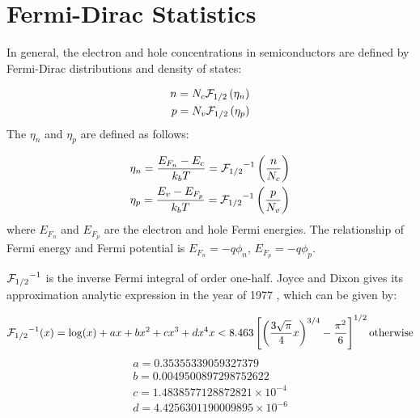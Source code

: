 \documentclass[oneside,12pt]{cgd_book}
\begin{document}
\section{Fermi-Dirac Statistics}
In general, the electron and hole concentrations in semiconductors are defined by Fermi-Dirac
      distributions and density of states:
\par
\begin{subequations}
\begin{align}
 n = N_c {\cal F}_{1/2} \left(\eta _n\right) \\
 p = N_v {\cal F}_{1/2} \left(\eta _p\right)
\end{align}
\end{subequations}
The $\eta _n$ and $\eta _p$ are defined as
      follows:
\par
\begin{subequations}
\begin{align}
 \eta_n = \frac{ E_{F_n} - E_c }{k_b T} = {{\cal F}_{1/2}}^{-1} \left(\frac{n}{N_c}\right) \\
 \eta_p = \frac{ E_v - E_{F_p} }{k_b T} = {{\cal F}_{1/2}}^{-1} \left(\frac{p}{N_v}\right)
\end{align}
\end{subequations}
where $E_{F_n}$ and $E_{F_p}$ are the electron and
      hole Fermi energies. The relationship of Fermi energy and Fermi potential is
$E_{F_n}=-q\phi_n$, $E_{F_p}=-q\phi_p$.
\par
{}${{\cal F}_{1/2}}^{-1}$
is the inverse Fermi integral of order one-half. Joyce
        and Dixon gives its approximation analytic expression in the year of 1977
\cite[Joyce1977]{}, which
        can be given by:
\par
\par
\begin{equation}
{{\cal F}_{1/2}}^{-1} (x) =   \log(x) + ax + bx^2 + cx^3 + dx^4 x < 8.463
         \left[ \left( {\dfrac{3\sqrt \pi }{4} x} \right)^{3/4} - \dfrac{\pi^2}{6} \right]^{1/2}
        \text{otherwise} \\
\end{equation}
\begin{subequations}
\begin{align}
 a = 0.35355339059327379 \\
 b = 0.0049500897298752622 \\
 c = 1.4838577128872821 \times 10^{-4} \\
 d = 4.4256301190009895 \times 10^{-6}
\end{align}
\end{subequations}
\end{document}
